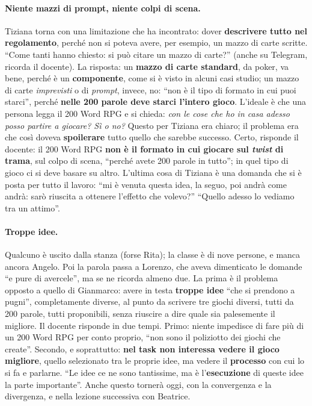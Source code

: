 \paragraph{Niente mazzi di prompt, niente colpi di scena.} Tiziana torna con una
limitazione che ha incontrato: dover \textbf{descrivere tutto nel regolamento},
perché non si poteva avere, per esempio, un mazzo di carte scritte. ``Come tanti
hanno chiesto: si può citare un mazzo di carte?'' (anche su Telegram, ricorda il
docente). La risposta: un \textbf{mazzo di carte standard}, da poker, va bene,
perché è un \textbf{componente}, come si è visto in alcuni casi studio; un mazzo di
carte \emph{imprevisti} o di \emph{prompt}, invece, no: ``non è il tipo di formato in
cui puoi starci'', perché \textbf{nelle 200 parole deve starci l'intero gioco}.
L'ideale è che una persona legga il 200 Word RPG e si chieda: \emph{con le cose che
ho in casa adesso posso partire a giocare? Sì o no?} Questo per Tiziana era chiaro;
il problema era che così doveva \textbf{spoilerare} tutto quello che sarebbe
successo. Certo, risponde il docente: il 200 Word RPG \textbf{non è il formato in cui
giocare sul \emph{twist} di trama}, sul colpo di scena, ``perché avete 200 parole in
tutto''; in quel tipo di gioco ci si deve basare su altro. L'ultima cosa di Tiziana è
una domanda che si è posta per tutto il lavoro: ``mi è venuta questa idea, la seguo,
poi andrà come andrà: sarò riuscita a ottenere l'effetto che volevo?'' ``Quello
adesso lo vediamo tra un attimo''.

\paragraph{Troppe idee.} Qualcuno è uscito dalla stanza (forse Rita); la classe è di
nove persone, e manca ancora Angelo. Poi la parola passa a Lorenzo, che aveva
dimenticato le domande ``e pure di avercele'', ma se ne ricorda almeno due. La prima
è il problema opposto a quello di Gianmarco: avere in testa \textbf{troppe idee}
``che si prendono a pugni'', completamente diverse, al punto da scrivere tre giochi
diversi, tutti da 200 parole, tutti proponibili, senza riuscire a dire quale sia
palesemente il migliore. Il docente risponde in due tempi. Primo: niente impedisce di
fare più di un 200 Word RPG per conto proprio, ``non sono il poliziotto dei giochi
che create''. Secondo, e soprattutto: \textbf{nel task non interessa vedere il gioco
migliore}, quello selezionato tra le proprie idee, ma vedere il \textbf{processo} con
cui lo si fa e parlarne. ``Le idee ce ne sono tantissime, ma è l'\textbf{esecuzione}
di queste idee la parte importante''. Anche questo tornerà oggi, con la convergenza
e la divergenza, e nella lezione successiva con Beatrice.

